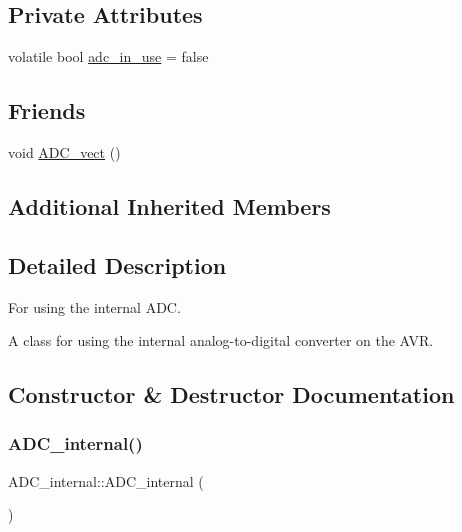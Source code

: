 \subsection*{Private Attributes}
\begin{DoxyCompactItemize}
\item 
volatile bool \hyperlink{class_a_d_c__internal_a7313da9fa620eae7be708a58d35dbe71}{adc\+\_\+in\+\_\+use} = false
\end{DoxyCompactItemize}
\subsection*{Friends}
\begin{DoxyCompactItemize}
\item 
void \hyperlink{class_a_d_c__internal_a7fd45f1c13cbbf59c3e1ce84deca2e01}{A\+D\+C\+\_\+vect} ()
\end{DoxyCompactItemize}
\subsection*{Additional Inherited Members}


\subsection{Detailed Description}
For using the internal A\+DC. 

A class for using the internal analog-\/to-\/digital converter on the A\+VR. 

\subsection{Constructor \& Destructor Documentation}
\hypertarget{class_a_d_c__internal_a4a34ce3ab980b7ab37672153c86d229a}{}\label{class_a_d_c__internal_a4a34ce3ab980b7ab37672153c86d229a} 
\subsubsection{\texorpdfstring{A\+D\+C\+\_\+internal()}{ADC\_internal()}\hspace{0.1cm}{\footnotesize\ttfamily [1/2]}}
{\footnotesize\ttfamily A\+D\+C\+\_\+internal\+::\+A\+D\+C\+\_\+internal (\begin{DoxyParamCaption}{ }\end{DoxyParamCaption})\hspace{0.3cm}{\ttfamily [private]}}

